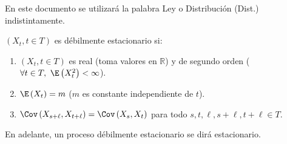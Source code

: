 En este documento se utilizar\'{a} la palabra Ley o Distribuci\'{o}n (Dist.) indistintamente.

\begin{definicion}$(X_{t}, t\in T)$ es d\'{e}bilmente estacionario si:
\begin{enumerate}
\item $(X_{t}, t\in T)$ es real (toma valores en $\mathbb{R}$) y de segundo orden ($ \forall t\in T,\ \E\left( X_{t}^{2} \right)<\infty$).
\item $\E\left( X_{t} \right)=m$ ($m$ es constante independiente de $t$).
\item $\Cov\left( X_{s+\ell},X_{t+\ell} \right)=\Cov\left( X_{s},X_{t} \right)$ para todo $s, t, \ell, s+\ell, t+\ell\in T$.
\end{enumerate}
\end{definicion}

\begin{observacion}
  En adelante, un proceso d\'{e}bilmente estacionario se dir\'{a} estacionario. 
\end{observacion}

